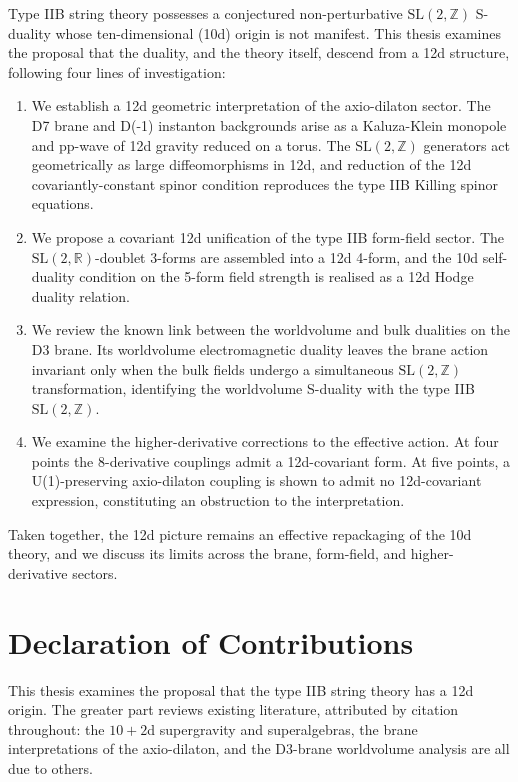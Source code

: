 \documentclass[11pt]{article}
\newcommand{\SLZ}{\ensuremath{\mathrm{SL}(2,\mathbb{Z})}}
\newcommand{\SLR}{\ensuremath{\mathrm{SL}(2,\mathbb{R})}}
\begin{document}
Type IIB string theory possesses a conjectured non-perturbative \SLZ{} S-duality whose ten-dimensional (10d) origin is not manifest. This thesis examines the proposal that the duality, and the theory itself, descend from a 12d structure, following four lines of investigation:
\begin{enumerate}
    \item We establish a 12d geometric interpretation of the axio-dilaton sector. The D7 brane and D(-1) instanton backgrounds arise as a Kaluza-Klein monopole and pp-wave of 12d gravity reduced on a torus. The \SLZ{} generators act geometrically as large diffeomorphisms in 12d, and reduction of the 12d covariantly-constant spinor condition reproduces the type IIB Killing spinor equations.
    \item We propose a covariant 12d unification of the type IIB form-field sector. The \SLR{}-doublet 3-forms are assembled into a 12d 4-form, and the 10d self-duality condition on the 5-form field strength is realised as a 12d Hodge duality relation.
    \item We review the known link between the worldvolume and bulk dualities on the D3 brane.
    Its worldvolume electromagnetic duality leaves the brane action invariant only when the bulk fields undergo a simultaneous \SLZ{} transformation, identifying the worldvolume S-duality with the type IIB \SLZ{}.
    \item We examine the higher-derivative corrections to the effective action.
    At four points the 8-derivative couplings admit a 12d-covariant form. At five points, a U(1)-preserving axio-dilaton coupling is shown to admit no 12d-covariant expression, constituting an obstruction to the interpretation.
\end{enumerate}
Taken together, the 12d picture remains an effective repackaging of the 10d theory, and we discuss its limits across the brane, form-field, and higher-derivative sectors.


\clearpage
\section*{Declaration of Contributions}

This thesis examines the proposal that the type IIB string theory has a 12d origin.
The greater part reviews existing literature, attributed by citation throughout: the $10+2$d supergravity and superalgebras, the brane interpretations of the axio-dilaton, and the D3-brane worldvolume analysis are all due to others.
\end{document}

